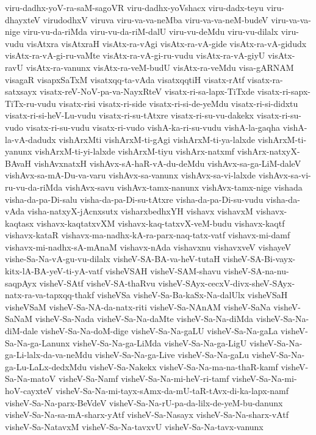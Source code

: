 {viru-dadhx-yoV-ra-saM-sagoVR
viru-dadhx-yoVshacx
viru-dadx-teyu
viru-dhayxteV
virudodhxV
viruva
viru-va-va-neMba
viru-va-va-neM-budeV
viru-va-va-nige
viru-vu-da-riMda
viru-vu-da-riM-dalU
viru-vu-deMdu
viru-vu-dilalx
viru-vudu
visAtxra
visAtxraH
visAtx-ra-vAgi
visAtx-ra-vA-gide
visAtx-ra-vA-gidudx
visAtx-ra-vA-gi-ru-vaMte
visAtx-ra-vA-gi-ru-vudu
visAtx-ra-vA-giyU
visAtx-ravU
visAtx-ra-vanunx
visAtx-ra-veM-budU
visAtx-ra-veMdu
visa-gARNAM
visagaR
visapxSaTxM
visatxqq-ta-vAda
visatxqqtiH
visatx-rAtf
visatx-ra-satxsayx
visatx-reV-NoV-pa-va-NayxRteV
visatx-ri-sa-lapx-TiTxde
visatx-ri-sapx-TiTx-ru-vudu
visatx-risi
visatx-ri-side
visatx-ri-si-de-yeMdu
visatx-ri-si-didxtu
visatx-ri-si-heV-Lu-vudu
visatx-ri-su-tAtxre
visatx-ri-su-vu-dakekx
visatx-ri-su-vudo
visatx-ri-su-vudu
visatx-ri-vudo
vishA-ka-ri-su-vudu
vishA-la-gaqha
vishA-la-vA-dadudx
vishArxMti
vishArxM-ti-gAgi
vishArxM-ti-ya-lalxde
vishArxM-ti-yanunx
vishArxM-ti-yi-lalxde
vishArxM-tiyu
vishArx-natxmf
vishArx-natxyX-BAvaH
vishAvxnatxH
vishAvx-sA-haR-vA-du-deMdu
vishAvx-sa-ga-LiM-daleV
vishAvx-sa-mA-Du-va-varu
vishAvx-sa-vanunx
vishAvx-sa-vi-lalxde
vishAvx-sa-vi-ru-vu-da-riMda
vishAvx-savu
vishAvx-tamx-nanunx
vishAvx-tamx-nige
vishada
visha-da-pa-Di-salu
visha-da-pa-Di-su-tAtxre
visha-da-pa-Di-su-vudu
visha-da-vAda
visha-natxyX-jAcnxsutx
visharxbedhxYH
vishavx
vishavxM
vishavx-kaqtasx
vishavx-kaqtatxvXM
vishavx-kaq-tatxvX-veM-budu
vishavx-kaqtf
vishavx-kataR
vishavx-ma-nadhx-kA-ra-parx-naq-tatx-vatf
vishavx-mi-damf
vishavx-mi-nadhx-sA-mAnaM
vishavx-nAda
vishavxnu
vishavxveV
vishayeV
vishe-Sa-Na-vA-gu-vu-dilalx
visheV-SA-BA-va-heV-tutaH
visheV-SA-Bi-vayx-kitx-lA-BA-yeV-ti-yA-vatf
visheVSAH
visheV-SAM-shavu
visheV-SA-na-nu-saqpAyx
visheV-SAtf
visheV-SA-thaRvu
visheV-SAyx-cecxV-divx-sheV-SAyx-natx-ra-va-tapxqq-thakf
visheVSa
visheV-Sa-Ba-kaSx-Na-dalUlx
visheVSaH
visheVSaM
visheV-Sa-NA-da-natx-riti
visheV-Sa-NAnAM
visheV-SaNa
visheV-SaNaM
visheV-Sa-Nada
visheV-Sa-Na-daMte
visheV-Sa-Na-diMda
visheV-Sa-Na-diM-dale
visheV-Sa-Na-doM-dige
visheV-Sa-Na-gaLU
visheV-Sa-Na-gaLa
visheV-Sa-Na-ga-Lanunx
visheV-Sa-Na-ga-LiMda
visheV-Sa-Na-ga-LigU
visheV-Sa-Na-ga-Li-lalx-da-va-neMdu
visheV-Sa-Na-ga-Live
visheV-Sa-Na-gaLu
visheV-Sa-Na-ga-Lu-LaLx-dedxMdu
visheV-Sa-Nakekx
visheV-Sa-Na-ma-na-thaR-kamf
visheV-Sa-Na-matoV
visheV-Sa-Namf
visheV-Sa-Na-mi-heV-ri-tamf
visheV-Sa-Na-mi-hoV-cayxteV
visheV-Sa-Na-mi-tayx-sAmx-da-mU-taR-tAvx-di-ka-lapx-namf
visheV-Sa-Na-parx-BeVdeV
visheV-Sa-Na-rU-pa-da-lilx-de-yeM-bu-danunx
visheV-Sa-Na-sa-mA-sharx-yAtf
visheV-Sa-Nasayx
visheV-Sa-Na-sharx-vAtf
visheV-Sa-NatavxM
visheV-Sa-Na-tavxvU
visheV-Sa-Na-tavx-vanunx
}
